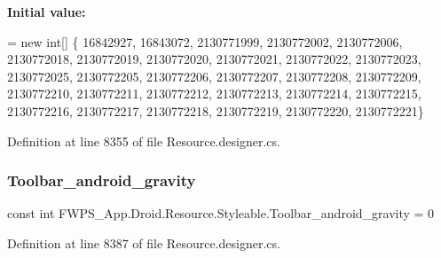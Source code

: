 {\bfseries Initial value\+:}
\begin{DoxyCode}
= \textcolor{keyword}{new} \textcolor{keywordtype}{int}[] \{
                    16842927,
                    16843072,
                    2130771999,
                    2130772002,
                    2130772006,
                    2130772018,
                    2130772019,
                    2130772020,
                    2130772021,
                    2130772022,
                    2130772023,
                    2130772025,
                    2130772205,
                    2130772206,
                    2130772207,
                    2130772208,
                    2130772209,
                    2130772210,
                    2130772211,
                    2130772212,
                    2130772213,
                    2130772214,
                    2130772215,
                    2130772216,
                    2130772217,
                    2130772218,
                    2130772219,
                    2130772220,
                    2130772221\}
\end{DoxyCode}


Definition at line 8355 of file Resource.\+designer.\+cs.

\mbox{\label{class_f_w_p_s___app_1_1_droid_1_1_resource_1_1_styleable_acb8e5b879e8027e545cf5462ec21fcfd}} 
\subsubsection{\texorpdfstring{Toolbar\+\_\+android\+\_\+gravity}{Toolbar\_android\_gravity}}
{\footnotesize\ttfamily const int F\+W\+P\+S\+\_\+\+App.\+Droid.\+Resource.\+Styleable.\+Toolbar\+\_\+android\+\_\+gravity = 0}



Definition at line 8387 of file Resource.\+designer.\+cs.

\mbox{\label{class_f_w_p_s___app_1_1_droid_1_1_resource_1_1_styleable_adb19071d3a3d5697aae629cbe1ae6d7d}} 
